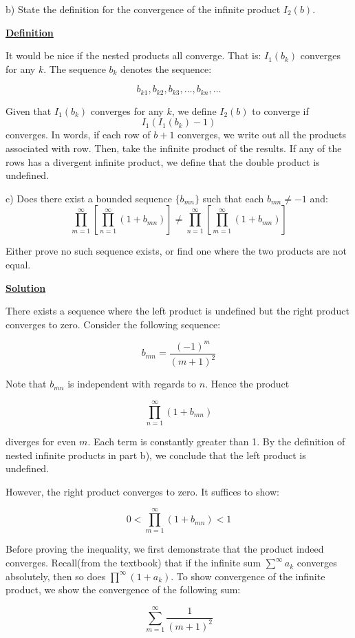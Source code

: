 \documentclass{article}
\newcommand{\new}[1]{
    \vspace{2mm}
    \noindent
    \textbf{
    \underline{#1}}
}
\begin{document}
\vspace{5mm}
b) State the definition for the convergence of the infinite product 
$I_2(b)$.

\new{Definition}
It would be nice if the nested products all converge. That is:
$I_1(b_k)$ converges for any $k$. The sequence $b_k$ denotes the 
sequence:

\[
    b_{k1}, b_{k2}, b_{k3}, \dots, b_{kn}, \dots
\]

Given that $I_1(b_k)$ converges for any $k$, we define $I_2(b)$ 
to converge if \[I_1(I_1(b_k) - 1)\] converges. In words, if each 
row of $b + 1$ converges, we write out all the products associated 
with row. Then, take 
the infinite product of the results. If any of the rows 
has a divergent infinite product, we define that the 
double product is undefined. 

\newpage
c) Does there exist a bounded sequence 
$\{b_{mn}\}$ such that each $b_{mn} \neq -1$ 
and:
\[
    \prod_{m = 1}^\infty 
    \left[
        \prod_{n = 1}^\infty 
        (1+ b_{mn})
    \right]
    \neq 
    \prod_{n = 1}^\infty 
    \left[
        \prod_{m = 1}^\infty 
        (1+b_{mn})
    \right]
\]

Either prove no such sequence exists, or find one where 
the two products are not equal. 

\new{Solution} 
There exists a sequence where the left product is undefined 
but the right product converges to zero. Consider the following 
sequence:

\[
    b_{mn} = \frac{(-1)^m}{(m + 1)^2}
\]

Note that $b_{mn}$ is independent with regards to $n$. Hence 
the product 

\[
    \prod_{n = 1}^\infty (1+b_{mn})
\]

diverges for even $m$. Each term is constantly greater than 1. 
By the definition of nested infinite products in part b), we conclude 
that the left product is undefined. 

However, the right product converges to zero. It suffices to show:

\[
    0 < \prod_{m = 1}^\infty (1 + b_{mn}) < 1
\]

Before proving the inequality, we first demonstrate that the 
product indeed converges. Recall(from the textbook) that 
if the infinite sum $\sum^\infty a_k$ converges absolutely, then so does 
$\prod^\infty (1+a_k)$. To show convergence of the infinite product, 
we show the convergence of the following sum:

\[
    \sum_{m = 1}^\infty \frac{1}{(m+1)^2}
\]
\end{document}
